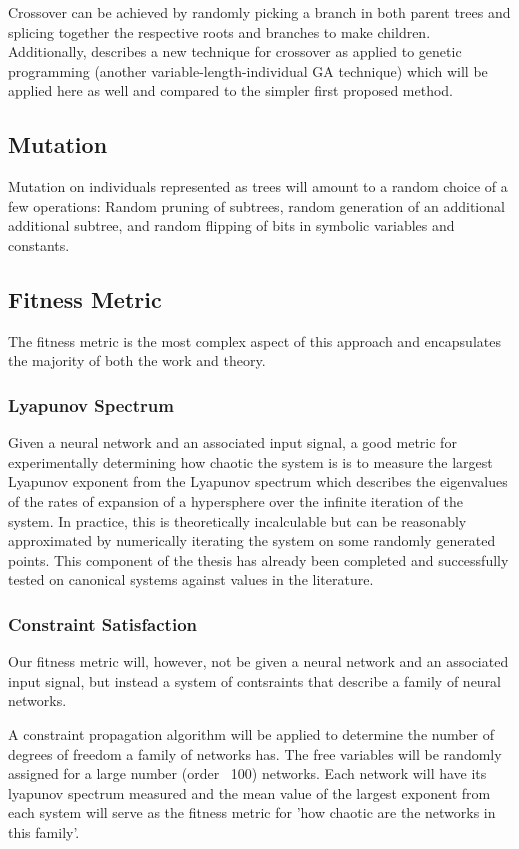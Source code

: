 \documentclass[12pt]{article}
\begin{document}
Crossover can be achieved by randomly picking a branch in both parent trees
and splicing together the respective roots and branches to make children.
Additionally, \cite{clegg} describes a new technique for crossover as applied to
genetic programming (another variable-length-individual GA technique) which
will be applied here as well and compared to the simpler first proposed method.

\subsection{Mutation}
Mutation on individuals represented as trees will amount to a random choice of 
a few operations:  Random pruning of subtrees, random generation of an 
additional additional subtree, and random flipping of bits in symbolic 
variables and constants.

\subsection{Fitness Metric}
The fitness metric is the most complex aspect of this approach and encapsulates
the majority of both the work and theory.

\subsubsection{Lyapunov Spectrum}
Given a neural network and an associated input signal, a good metric for
experimentally determining how chaotic the system is is to measure the
largest Lyapunov exponent from the Lyapunov spectrum which describes the
eigenvalues of the rates of expansion of a hypersphere over the infinite
iteration of the system.  In practice, this is theoretically incalculable but
can be reasonably approximated by numerically iterating the system on 
some randomly generated points\cite{sprott}.  This component of the thesis
has already been completed and successfully tested on canonical systems
against values in the literature.

\subsubsection{Constraint Satisfaction}
Our fitness metric will, however, not be given a neural network and an 
associated input signal, but instead a system of contsraints that describe
a family of neural networks.

A constraint propagation algorithm \cite{norvig}  will be applied to
determine the number of degrees of freedom a family of networks has.
The free variables will be randomly assigned for a large number (order ~100)
networks.  Each network will have its lyapunov spectrum measured and the mean
value of the largest exponent from each system will serve as the fitness metric
for 'how chaotic are the networks in this family'.
\end{document}
